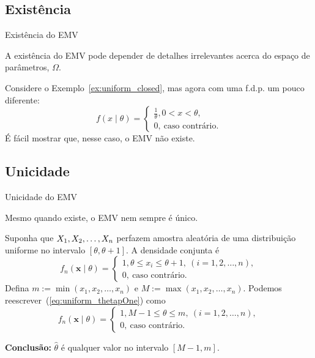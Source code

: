 \subsection*{Existência} 
\begin{frame}{Existência do EMV}
\begin{obs}
A existência do EMV pode depender de detalhes irrelevantes acerca do espaço de parâmetros, $\Omega$. 
\end{obs}
\begin{exemplo}
 Considere o Exemplo~\ref{ex:uniform_closed}, mas agora com uma f.d.p. um pouco diferente:
 \begin{equation}
  \label{eq:uniform_open}
    f(x\mid \theta)=
 \begin{cases}
     \frac{1}{\theta}, 0 < x < \theta,\\
     0,\:\text{caso contrário}.
\end{cases}
 \end{equation} 
É fácil mostrar que, nesse caso, o EMV não existe. 
\end{exemplo}
\end{frame}

\subsection*{Unicidade} 

\begin{frame}{Unicidade do EMV}

\begin{obs}
Mesmo quando existe, o EMV nem sempre é único. 
\end{obs}

\begin{exemplo}
 Suponha que $X_1, X_2, \ldots, X_n$ perfazem amostra aleatória de uma distribuição uniforme no intervalo $[\theta, \theta + 1]$.
A densidade conjunta é
  \begin{equation}
  \label{eq:uniform_thetapOne}
    f_n(\boldsymbol{x}\mid \theta)=
 \begin{cases}
     1, \theta \leq x_i \leq \theta + 1, \: (i = 1, 2, \ldots, n),\\
     0,\:\text{caso contrário}.
\end{cases}
 \end{equation}
Defina $m := \min(x_1, x_2, \ldots, x_n)$ e $M := \max(x_1, x_2, \ldots, x_n)$.
Podemos reescrever~(\ref{eq:uniform_thetapOne}) como 
  \begin{equation}
  \label{eq:uniform_thetapOne_b}
    f_n(\boldsymbol{x}\mid \theta)=
 \begin{cases}
     1, M - 1 \leq \theta \leq m, \: (i = 1, 2, \ldots, n),\\
     0,\:\text{caso contrário}.
\end{cases}
 \end{equation}
\end{exemplo}
\textbf{Conclusão:} $\hat{\theta}$ é qualquer valor no intervalo $[M-1, m]$.
\end{frame}
 
